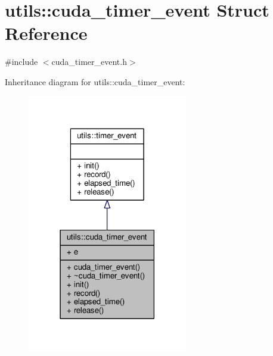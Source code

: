 \hypertarget{structutils_1_1cuda__timer__event}{\section{utils\-:\-:cuda\-\_\-timer\-\_\-event Struct Reference}
\label{structutils_1_1cuda__timer__event}
}


{\ttfamily \#include $<$cuda\-\_\-timer\-\_\-event.\-h$>$}



Inheritance diagram for utils\-:\-:cuda\-\_\-timer\-\_\-event\-:
\nopagebreak
\begin{figure}[H]
\begin{center}
\leavevmode
\includegraphics[width=198pt]{structutils_1_1cuda__timer__event__inherit__graph}
\end{center}
\end{figure}



